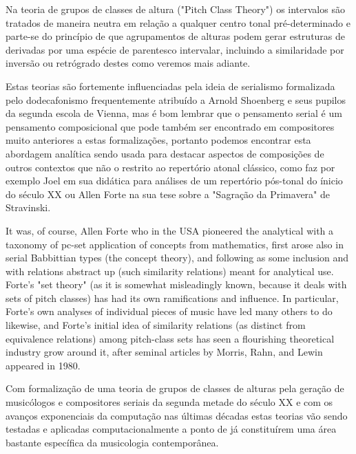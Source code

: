 \documentclass[
	12pt,				%
	openright,			%
	twoside,			%
	a4paper,			%
	english,			%
	french,				%
	spanish,			%
	brazil				%
	]{abntex2}
\begin{document}
Na teoria de grupos de classes de altura ("Pitch Class Theory") os intervalos são tratados de maneira neutra em relação a qualquer centro tonal pré-determinado e parte-se do princípio de que agrupamentos de alturas podem gerar estruturas de derivadas por uma espécie de parentesco intervalar, incluindo a similaridade por inversão ou retrógrado destes como veremos mais adiante. 

Estas teorias são fortemente influenciadas pela ideia de serialismo formalizada pelo dodecafonismo frequentemente atribuído a Arnold Shoenberg e seus pupilos da segunda escola de Vienna, mas é bom lembrar que o pensamento serial é um pensamento composicional que pode também ser encontrado em compositores muito anteriores a estas formalizações, portanto podemos encontrar esta abordagem analítica sendo usada para destacar aspectos de composições de outros contextos que não o restrito ao repertório atonal clássico, como faz por exemplo Joel  em sua didática para análises de um repertório pós-tonal do ínicio do século XX ou Allen Forte na sua tese sobre a "Sagração da Primavera" de Stravinski\cite{forte1978harmonic}.

\begin{citacao}
It was, of course, Allen Forte who in the USA pioneered the analytical with a taxonomy of pc-set application of concepts from mathematics, first arose also in serial Babbittian types (the concept theory), and following as
some inclusion and with relations abstract up (such similarity relations) meant for analytical use. Forte's "set theory" (as it is somewhat misleadingly known, because it deals with sets of pitch classes) has had its own
ramifications and influence. In particular, Forte's own analyses of individual pieces of music have led many others to do likewise, and Forte's initial idea of similarity relations (as distinct from equivalence relations) among pitch-class sets has seen a flourishing theoretical industry grow around it, after seminal articles by Morris, Rahn, and Lewin appeared in 1980.\cite{rahn2004swerve}
\end{citacao}



Com formalização de uma teoria de grupos de classes de alturas pela geração de musicólogos e compositores seriais da segunda metade do século XX e com os avanços exponenciais da computação nas últimas décadas estas teorias vão sendo testadas e aplicadas computacionalmente a ponto de já constituírem uma área bastante específica da musicologia contemporânea. 
\end{document}
